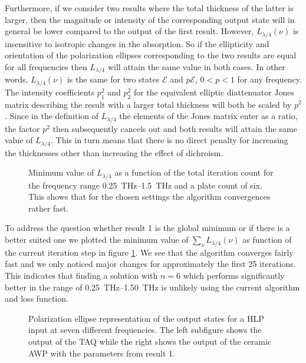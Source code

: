 Furthermore, if we consider two results where the total thickness of the latter is larger, then the magnitude or intensity of the corresponding output state will in general be lower compared to the output of the first result. However, $L_{\lambda/4}(\nu)$ is insensitive to isotropic changes in the absorption. So if the ellipticity and orientation of the polarization ellipses corresponding to the two results are equal for all frequencies then $L_{\lambda/4}$ will attain the same value in both cases. In other words, $L_{\lambda/4}(\nu)$ is the same for two states $\bm{\mathcal{E}}$ and $p\bm{\mathcal{E}}$, $0<p<1$ for any frequency. The intensity coefficients $p_1^2$ and $p_2^2$ for the equivalent elliptic diattenuator Jones matrix describing the result with a larger total thickness will both be scaled by $p^2$. Since in the definition of $L_{\lambda/4}$ the elements of the Jones matrix enter as a ratio, the factor $p^2$ then subsequently cancels out and both results will attain the same value of $L_{\lambda/4}$. This in turn means that there is no direct penalty for increasing the thicknesses other than increasing the effect of dichroism. 

\begin{figure}[H]
    \centering
    
    \caption{Minimum value of $L_{\lambda/4}$ as a function of the total iteration count for the frequency range \SIrange{0.25}{1.5}{\tera \hertz} and a plate count of six. This shows that for the chosen settings the algorithm convergences rather fast.}
    \label{fig:cl4_convergence}
\end{figure}

To address the question whether result 1 is the global minimum or if there is a better suited one we plotted the minimum value of $\sum_{\nu}L_{\lambda/4}(\nu)$ as function of the current iteration step in figure  \ref{fig:cl4_convergence}. We see that the algorithm converges fairly fast and we only noticed major changes for approximately the first 25 iterations. This indicates that finding a solution with $n=6$ which performs significantly better in the range of \SIrange{0.25}{1.50}{\tera \hertz} is unlikely using the current algorithm and loss function.

\begin{figure}[H]
    \centering
    
    \caption{Polarization ellipse representation of the output states for a HLP input at seven different frequencies. The left subfigure shows the output of the TAQ while the right shows the output of the ceramic AWP with the parameters from result 1.}
    \label{fig:cl4_pe_lp}
\end{figure}


